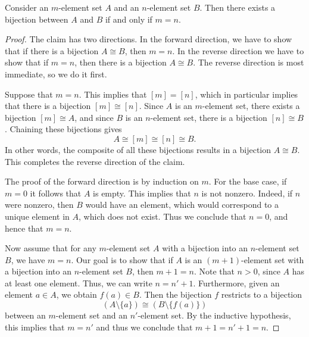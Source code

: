 \begin{theorem}\label{theorem:humes-principle}
  Consider an $m$-element set $A$ and an $n$-element set $B$. Then there exists a bijection between $A$ and $B$ if and only if $m=n$.
\end{theorem}

\begin{proof}
  The claim has two directions. In the forward direction, we have to show that if there is a bijection $A\cong B$, then $m=n$. In the reverse direction we have to show that if $m=n$, then there is a bijection $A\cong B$. The reverse direction is most immediate, so we do it first.

  Suppose that $m=n$. This implies that $[m]=[n]$, which in particular implies that there is a bijection $[m]\cong[n]$. Since $A$ is an $m$-element set, there exists a bijection $[m]\cong A$, and since $B$ is an $n$-element set, there is a bijection $[n]\cong B$. Chaining these bijections gives
  \begin{equation*}
    A\cong [m]\cong[n]\cong B.
  \end{equation*}
  In other words, the composite of all these bijections results in a bijection $A\cong B$. This completes the reverse direction of the claim.
  
  The proof of the forward direction is by induction on $m$. For the base case, if $m=0$ it follows that $A$ is empty. This implies that $n$ is not nonzero. Indeed, if $n$ were nonzero, then $B$ would have an element, which would correspond to a unique element in $A$, which does not exist. Thus we conclude that $n=0$, and hence that $m=n$.

  Now assume that for any $m$-element set $A$ with a bijection into an $n$-element set $B$, we have $m=n$. Our goal is to show that if $A$ is an $(m+1)$-element set with a bijection into an $n$-element set $B$, then $m+1=n$. Note that $n>0$, since $A$ has at least one element. Thus, we can write $n=n'+1$. Furthermore, given an element $a\in A$, we obtain $f(a)\in B$. Then the bijection $f$ restricts to a bijection
  \begin{equation*}
    (A\setminus \{a\})\cong (B\setminus\{f(a)\})
  \end{equation*}
  between an $m$-element set and an $n'$-element set. By the inductive hypothesis, this implies that $m=n'$ and thus we conclude that $m+1=n'+1=n$.
\end{proof}

